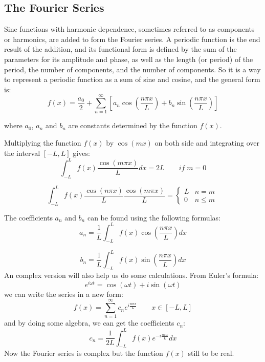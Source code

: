 \documentclass[12pt]{article}%
\begin{document}
\subsection{The Fourier Series}
Sine functions with harmonic dependence, sometimes referred to as components or harmonics, are added to form the Fourier series. A periodic function is the end result of the addition, and its functional form is defined by the sum of the parameters for its amplitude and phase, as well as the length (or period) of the period, the number of components, and the number of components.
So it is a way to represent a periodic function as a sum of sine and cosine, and the general form is:
\begin{equation}
    f(x) = \frac{a_0}{2} + \sum_{n=1}^{\infty} [a_n \cos(\frac{n\pi x}{L}) + b_n \sin(\frac{n\pi x}{L})]
\end{equation}

\noindent where $a_0$, $a_n$ and $b_n$ are constants determined by the function $f(x)$.

Multiplying the function $f(x)$ by $\cos(mx)$ on both side and integrating over the interval $[-L, L]$ gives:
\begin{equation}
    \int_{-L}^{L} f(x) \frac{\cos(m\pi x)}{L} dx = 2L  \qquad
    if \; m = 0 
\end{equation}

\begin{equation}
\int_{-L}^{L} f(x) \frac{\cos(n\pi x)}{L} \frac{\cos(m\pi x)}{L} =
    \begin{cases} 
        L & n = m \\
        0 & n \le m \
    \end{cases}
\end{equation}

The coefficients $a_n$ and $b_n$ can be found using the following formulas:
\begin{equation}
    a_n = \frac{1}{L} \int_{-L}^{L} f(x) \cos(\frac{n\pi x}{L}) dx
\end{equation}

\begin{equation}
    b_n = \frac{1}{L} \int_{-L}^{L} f(x) \sin(\frac{n\pi x}{L}) dx
\end{equation}
An complex version will also help us do some calculations. From Euler's formula:
$$e^{i \omega t} = \cos(\omega t) + i \sin(\omega t)$$
we can write the series in a new form:
\begin{equation}
    f(x) = \sum_{n=1}^{\infty} c_n e^{i\frac{n\pi x}{L}} \qquad x \in [-L, L]
\end{equation}
and by doing some algebra, we can get the coefficients $c_n$:
\begin{equation}
    c_n = \frac{1}{2L} \int_{-L}^{L} f(x) e^{-i\frac{n\pi x}{L}} dx
\end{equation}
Now the Fourier series is complex but the function $f(x)$ still to be real.
\end{document}
